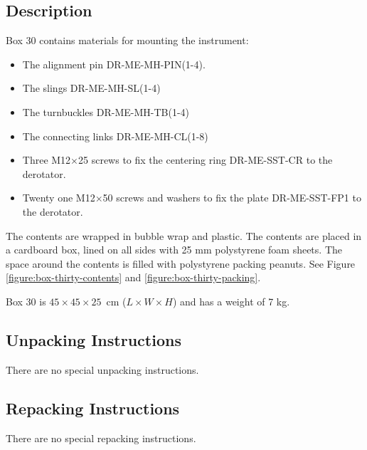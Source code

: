 \documentclass{article}
\begin{document}
\subsection{Description}

Box 30 contains materials for mounting the instrument:

\begin{itemize}
    \item The alignment pin DR-ME-MH-PIN(1-4).
    \item The slings DR-ME-MH-SL(1-4)
    \item The turnbuckles DR-ME-MH-TB(1-4)
    \item The connecting links DR-ME-MH-CL(1-8)
    \item Three M12$\times$25 screws to fix the centering ring DR-ME-SST-CR to the derotator.
    \item Twenty one M12$\times$50 screws and washers to fix the plate DR-ME-SST-FP1 to the derotator.
\end{itemize}

The contents are wrapped in bubble wrap and plastic.  The contents are placed in a cardboard box, lined on all sides with 25 mm polystyrene foam sheets. The space around the contents is filled with polystyrene packing peanuts. See Figure \ref{figure:box-thirty-contents} and \ref{figure:box-thirty-packing}.

Box 30 is $45 \times 45 \times 25$~cm ($L \times W \times H$) and has a weight of 7 kg.

\subsection{Unpacking Instructions}

There are no special unpacking instructions.

\subsection{Repacking Instructions}

There are no special repacking instructions.
\end{document}
